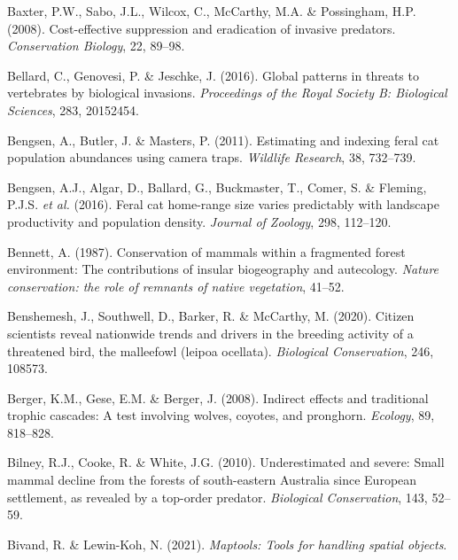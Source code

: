\documentclass[11pt,a4paper,titlepage,twoside,openright]{style/unimelbthesis}
\begin{document}
\begin{mainmatter}
\leavevmode\hypertarget{ref-baxter2008cost}{}%
Baxter, P.W., Sabo, J.L., Wilcox, C., McCarthy, M.A. \& Possingham, H.P. (2008). Cost-effective suppression and eradication of invasive predators. \emph{Conservation Biology}, 22, 89--98.

\leavevmode\hypertarget{ref-bellard2016global}{}%
Bellard, C., Genovesi, P. \& Jeschke, J. (2016). Global patterns in threats to vertebrates by biological invasions. \emph{Proceedings of the Royal Society B: Biological Sciences}, 283, 20152454.

\leavevmode\hypertarget{ref-bengsen2011estimating}{}%
Bengsen, A., Butler, J. \& Masters, P. (2011). Estimating and indexing feral cat population abundances using camera traps. \emph{Wildlife Research}, 38, 732--739.

\leavevmode\hypertarget{ref-bengsen2016feral}{}%
Bengsen, A.J., Algar, D., Ballard, G., Buckmaster, T., Comer, S. \& Fleming, P.J.S. \emph{et al.} (2016). Feral cat home-range size varies predictably with landscape productivity and population density. \emph{Journal of Zoology}, 298, 112--120.

\leavevmode\hypertarget{ref-bennett1987conservation}{}%
Bennett, A. (1987). Conservation of mammals within a fragmented forest environment: The contributions of insular biogeography and autecology. \emph{Nature conservation: the role of remnants of native vegetation}, 41--52.

\leavevmode\hypertarget{ref-benshemesh2020citizen}{}%
Benshemesh, J., Southwell, D., Barker, R. \& McCarthy, M. (2020). Citizen scientists reveal nationwide trends and drivers in the breeding activity of a threatened bird, the malleefowl (leipoa ocellata). \emph{Biological Conservation}, 246, 108573.

\leavevmode\hypertarget{ref-berger2008indirect}{}%
Berger, K.M., Gese, E.M. \& Berger, J. (2008). Indirect effects and traditional trophic cascades: A test involving wolves, coyotes, and pronghorn. \emph{Ecology}, 89, 818--828.

\leavevmode\hypertarget{ref-bilney2010underestimated}{}%
Bilney, R.J., Cooke, R. \& White, J.G. (2010). Underestimated and severe: Small mammal decline from the forests of south-eastern Australia since European settlement, as revealed by a top-order predator. \emph{Biological Conservation}, 143, 52--59.

\leavevmode\hypertarget{ref-maptools}{}%
Bivand, R. \& Lewin-Koh, N. (2021). \emph{Maptools: Tools for handling spatial objects}.


\end{mainmatter}
\end{document}
